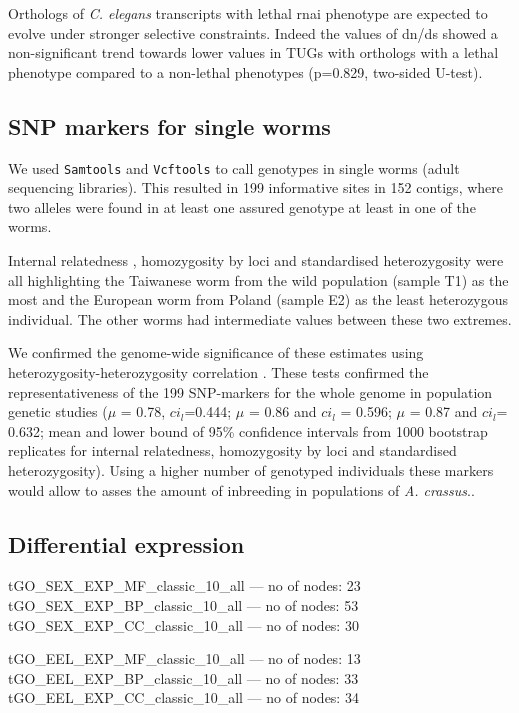 \documentclass[10pt]{bmc_article}
\newenvironment{bmcformat}{\begin{raggedright}\baselineskip20pt\sloppy\setboolean{publ}{false}}{\end{raggedright}\baselineskip20pt\sloppy}
\begin{document}
\begin{bmcformat}
Orthologs of \textit{C. elegans} transcripts with lethal
rnai phenotype are expected to evolve under stronger selective
constraints. Indeed the values of dn/ds showed a non-significant trend
towards lower values in TUGs with orthologs with a lethal phenotype
compared to a non-lethal phenotypes
(p=0.829, two-sided U-test).

\subsection*{SNP markers for single worms}

We used \texttt{Samtools}\cite{journals/bioinformatics/LiHWFRHMAD09}
and \texttt{Vcftools}\cite{pmid21653522} to call genotypes in single
worms (adult sequencing libraries). This resulted in 199
informative sites in 152 contigs, where two alleles
were found in at least one assured genotype at least in one of the
worms.

Internal relatedness \cite{pmid11571049}, homozygosity by loci
\cite{pmid17107491} and standardised heterozygosity \cite{coltman81j}
were all highlighting the Taiwanese worm from the wild population
(sample T1) as the most and the European worm from Poland (sample E2)
as the least heterozygous individual. The other worms had intermediate
values between these two extremes.

We confirmed the genome-wide significance of these estimates using
heterozygosity-heterozygosity correlation \cite{pmid21565077}. These
tests confirmed the representativeness of the 199
SNP-markers for the whole genome in population genetic studies ($\mu$
= 0.78, $ci_l$=0.444; $\mu$ = 0.86 and $ci_l$ = 0.596; $\mu$ = 0.87
and $ci_l$= 0.632; mean and lower bound of 95\% confidence intervals
from 1000 bootstrap replicates for internal relatedness, homozygosity
by loci and standardised heterozygosity). Using a higher number of
genotyped individuals these markers would allow to asses the amount of
inbreeding in populations of \textit{A. crassus}..

 \subsection*{Differential expression}
                


\begin{Schunk}
\begin{Soutput}
tGO_SEX_EXP_MF_classic_10_all  --- no of nodes:  23 
tGO_SEX_EXP_BP_classic_10_all  --- no of nodes:  53 
tGO_SEX_EXP_CC_classic_10_all  --- no of nodes:  30 
\end{Soutput}
\begin{Soutput}
tGO_EEL_EXP_MF_classic_10_all  --- no of nodes:  13 
tGO_EEL_EXP_BP_classic_10_all  --- no of nodes:  33 
tGO_EEL_EXP_CC_classic_10_all  --- no of nodes:  34 
\end{Soutput}
\end{Schunk}


\end{bmcformat}
\end{document}
